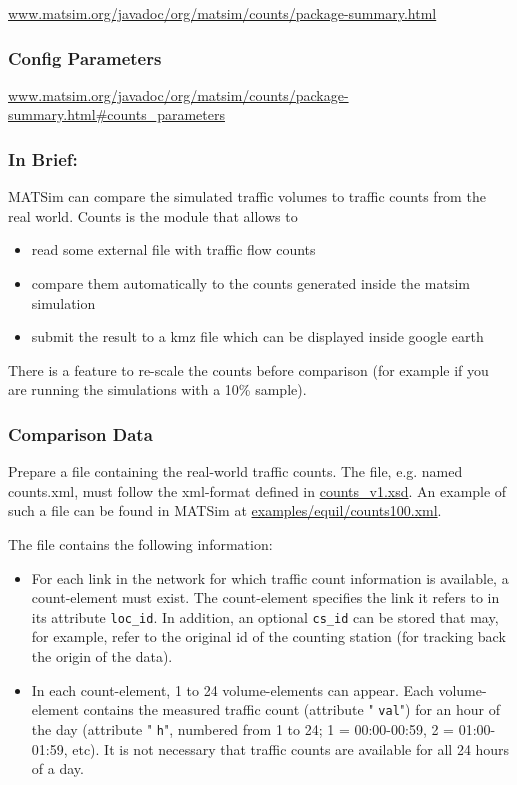 \documentclass[a4paper,11pt]{report}
\begin{document}
\href{http://www.matsim.org/javadoc/org/matsim/counts/package-summary.html}{www.matsim.org/javadoc/org/matsim/counts/package-summary.html}


\subsubsection{\textbf{\textbf{Config Parameters{}}}}

\href{http://www.matsim.org/javadoc/org/matsim/counts/package-summary.html#counts_parameters}{www.matsim.org/javadoc/org/matsim/counts/package-summary.html\#counts\_parameters}

\subsubsection{\textbf{In Brief:}}

MATSim can compare the simulated traffic volumes to traffic counts from the real world. Counts is the module that allows to
\begin{itemize}
	\item read some external file with traffic flow counts
	\item compare them automatically to the counts generated inside the matsim simulation
	\item submit the result to a kmz file which can be displayed inside google earth
\end{itemize}

There is a feature to re-scale the counts before comparison (for example if you are running the simulations with a 10\% sample).

\subsubsection{Comparison Data}

Prepare a file containing the real-world traffic counts. The file, e.g. named counts.xml, must follow the xml-format defined in \href{http://matsim.org/files/dtd/counts_v1.xsd}{counts\_v1.xsd}. An example of such a file can be found in MATSim at \href{http://matsim.svn.sourceforge.net/viewvc/matsim/matsim/trunk/examples/equil/counts100.xml?content-type=text%2Fplain}{examples/equil/counts100.xml}.

The file contains the following information:
\begin{itemize}
	\item For each link in the network for which traffic count information  is available, a count-element must exist. The count-element specifies  the link it refers to in its attribute 
\texttt{loc\_id}. In addition, an optional 
\texttt{cs\_id}  can be stored that may, for example, refer to the original id of the  counting station (for tracking back the origin of the data).
	\item In each count-element, 1 to 24 volume-elements can appear. Each volume-element contains the measured traffic count (attribute "
\texttt{val}") for an hour of the day (attribute "
\texttt{h}",  numbered from 1 to 24; 1 = 00:00-00:59, 2 = 01:00-01:59, etc). It is  not necessary that traffic counts are available for all 24 hours of a  day.
\end{itemize}
\end{document}
